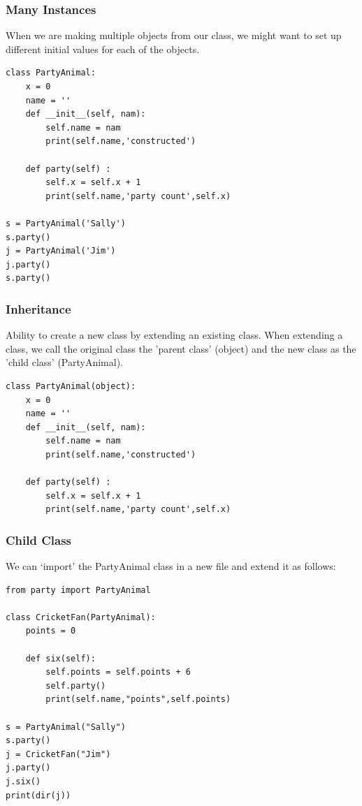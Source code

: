 \begin{frame}[fragile]\frametitle{Many Instances}
When we are making multiple objects from our class, we might want to set up different initial values for each of the objects.
\begin{lstlisting}
class PartyAnimal:
	x = 0
	name = ''
	def __init__(self, nam):
		self.name = nam
		print(self.name,'constructed')

	def party(self) :
		self.x = self.x + 1
		print(self.name,'party count',self.x)

s = PartyAnimal('Sally')
s.party()
j = PartyAnimal('Jim')
j.party()
s.party()
\end{lstlisting}
\end{frame}

\begin{frame}[fragile]\frametitle{Inheritance}
Ability to create a new class by extending an existing class. When extending a class, we call the
original class the 'parent class' (object) and the new class as the 'child class' (PartyAnimal).
\begin{lstlisting}
class PartyAnimal(object):
	x = 0
	name = ''
	def __init__(self, nam):
		self.name = nam
		print(self.name,'constructed')

	def party(self) :
		self.x = self.x + 1
		print(self.name,'party count',self.x)
\end{lstlisting}
\end{frame}


\begin{frame}[fragile]\frametitle{Child Class}
We can `import' the PartyAnimal class in a new file and extend it as follows:
\begin{lstlisting}
from party import PartyAnimal

class CricketFan(PartyAnimal):
	points = 0

	def six(self):
		self.points = self.points + 6
		self.party()
		print(self.name,"points",self.points)

s = PartyAnimal("Sally")
s.party()
j = CricketFan("Jim")
j.party()
j.six()
print(dir(j))	
\end{lstlisting}
\end{frame}

